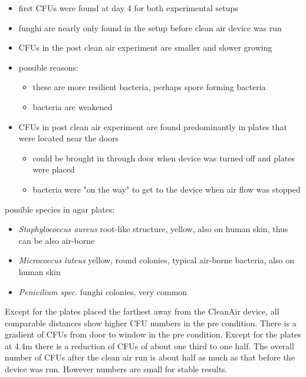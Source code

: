 \documentclass[hyperref]{labbook}
\begin{document}
\begin{itemize}
\item first CFUs were found at day 4 for both experimental setups
\item funghi are nearly only found in the setup before clean air device was run
\item CFUs in the post clean air experiment are smaller and slower growing
\item possible reasons:
\begin{itemize}
\item these are more resilient bacteria, perhaps spore forming bacteria
\item bacteria are weakened
\end{itemize}
\item CFUs in post clean air experiment are found predominantly in plates that were located near the doors
\begin{itemize}
\item could be brought in through door when device was turned off and plates were placed
\item bacteria were "on the way" to get to the device when air flow was stopped
\end{itemize}
\end{itemize}
possible species in agar plates:
\begin{itemize}
\item \textit{Staphylococcus aureus} root-like structure, yellow, also on human skin, thus can be also air-borne
\item \textit{Micrococcus luteus} yellow, round colonies, typical air-borne bacteria, also on human skin
\item \textit{Penicilium spec.} funghi colonies, very common
\end{itemize}

Except for the plates placed the farthest away from the CleanAir device, all comparable distances show higher CFU numbers in the pre condition. There is a gradient of CFUs from door to window in the pre condition. Except for the plates at 4.4m there is a reduction of CFUs of about one third to one half. The overall number of CFUs after the clean air run is about half as much as that before the device was run. However numbers are small for stable results.
\newpage
\end{document}

